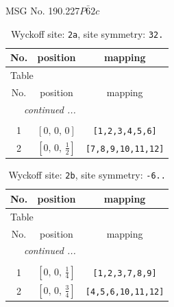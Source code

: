 \documentclass[fleqn,8pt]{jsarticle}
\begin{document}
\setcounter{MaxMatrixCols}{32}

\renewcommand{\tablename}{Table~}
\renewcommand{\figurename}{Figure~}
\begin{center}
\LARGE
MSG No. 190.227\quad$P\bar{6}2c$
\end{center}
\renewcommand{\arraystretch}{1.2}
\begin{longtable}{ccc}
\caption{Wyckoff site: {\tt 2a}, site symmetry: {\tt 32.}}
 \\
 \hline \hline
No. & position & mapping \\ \hline \endfirsthead

\multicolumn{2}{l}{\tablename\ \thetable{}} \\
 \hline \hline
No. & position & mapping \\ \hline \endhead

 \hline \hline
\multicolumn{2}{r}{\footnotesize\it continued ...} \\ \endfoot

 \hline \hline
\multicolumn{2}{r}{} \\ \endlastfoot

1 & $\left[ 0,\, 0,\, 0 \right]$ & {\tt [1,2,3,4,5,6]} \\ \hline
2 & $\left[ 0,\, 0,\, \frac{1}{2} \right]$ & {\tt [7,8,9,10,11,12]} \\
\end{longtable}
\renewcommand{\arraystretch}{1.2}
\begin{longtable}{ccc}
\caption{Wyckoff site: {\tt 2b}, site symmetry: {\tt -6..}}
 \\
 \hline \hline
No. & position & mapping \\ \hline \endfirsthead

\multicolumn{2}{l}{\tablename\ \thetable{}} \\
 \hline \hline
No. & position & mapping \\ \hline \endhead

 \hline \hline
\multicolumn{2}{r}{\footnotesize\it continued ...} \\ \endfoot

 \hline \hline
\multicolumn{2}{r}{} \\ \endlastfoot

1 & $\left[ 0,\, 0,\, \frac{1}{4} \right]$ & {\tt [1,2,3,7,8,9]} \\ \hline
2 & $\left[ 0,\, 0,\, \frac{3}{4} \right]$ & {\tt [4,5,6,10,11,12]} \\
\end{longtable}
\renewcommand{\arraystretch}{1.2}
\end{document}
